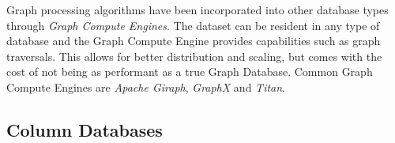 Graph processing algorithms have been incorporated into other database types through \emph{Graph Compute Engines}. The dataset can be resident in any type of database and the Graph Compute Engine provides capabilities such as graph traversals. This allows for better distribution and scaling, but comes with the cost of not being as performant as a true Graph Database. Common Graph Compute Engines are \emph{Apache Giraph}, \emph{GraphX} and \emph{Titan}.

\subsection{Column Databases}
\label{intro-col-db}

